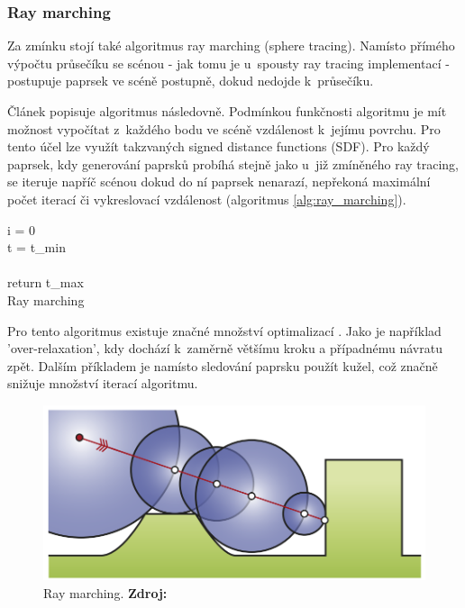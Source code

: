 \subsubsection{Ray marching}
Za zmínku stojí také algoritmus ray marching (sphere tracing). Namísto přímého výpočtu průsečíku se scénou - jak tomu je u~spousty ray tracing implementací - postupuje paprsek ve scéně postupně, dokud nedojde k~průsečíku.

Článek \cite{sphere_tracing} popisuje algoritmus následovně. Podmínkou funkčnosti algoritmu je mít možnost vypočítat z~každého bodu ve scéně vzdálenost k~jejímu povrchu. Pro tento účel lze využít takzvaných signed distance functions (SDF). Pro každý paprsek, kdy generování paprsků probíhá stejně jako u~již zmíněného ray tracing, se iteruje napříč scénou dokud do ní paprsek nenarazí, nepřekoná maximální počet iterací či vykreslovací vzdálenost (algoritmus \ref{alg:ray_marching}).


\begin{center}
	\begin{czechalgorithm}[H] \label{alg:ray_marching}
		i = 0\\
		t = t\_min\\
		\\
		return t\_max\\
		\caption{Ray marching}
	\end{czechalgorithm}
\end{center}

Pro tento algoritmus existuje značné množství optimalizací \cite{Keinert2014EnhancedST}. Jako je například 'over-relaxation', kdy dochází k~zaměrně většímu kroku a případnému návratu zpět. Dalším příkladem je namísto sledování paprsku použít kužel, což značně snižuje množství iterací algoritmu.

\begin{figure}[H]
	\centering
	\includegraphics[scale=0.8]{obrazky-figures/ray_marching.png}
	\caption{Ray marching. \textbf{Zdroj: \cite{Keinert2014EnhancedST}}}
	\label{fig:ray_marching}
\end{figure}


